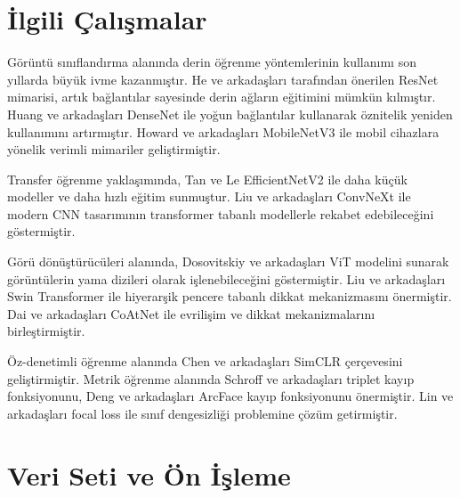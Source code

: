 \documentclass[conference]{IEEEtran}
\begin{document}
\section{\.{I}lgili \c{C}al{\i}\c{s}malar}
G\"{o}r\"{u}nt\"{u} s{\i}n{\i}fland{\i}rma alan{\i}nda derin \"{o}\u{g}renme y\"{o}ntemlerinin kullan{\i}m{\i} son y{\i}llarda b\"{u}y\"{u}k ivme kazanm{\i}\c{s}t{\i}r. He ve arkada\c{s}lar{\i} \cite{he2016deep} taraf{\i}ndan \"{o}nerilen ResNet mimarisi, art{\i}k ba\u{g}lant{\i}lar sayesinde derin a\u{g}lar{\i}n e\u{g}itimini m\"{u}mk\"{u}n k{\i}lm{\i}\c{s}t{\i}r. Huang ve arkada\c{s}lar{\i} \cite{huang2017densely} DenseNet ile yo\u{g}un ba\u{g}lant{\i}lar kullanarak \"{o}znitelik yeniden kullan{\i}m{\i}n{\i} art{\i}rm{\i}\c{s}t{\i}r. Howard ve arkada\c{s}lar{\i} \cite{howard2019searching} MobileNetV3 ile mobil cihazlara y\"{o}nelik verimli mimariler geli\c{s}tirmi\c{s}tir.

Transfer \"{o}\u{g}renme yakla\c{s}{\i}m{\i}nda, Tan ve Le \cite{tan2021efficientnetv2} EfficientNetV2 ile daha k\"{u}\c{c}\"{u}k modeller ve daha h{\i}zl{\i} e\u{g}itim sunmu\c{s}tur. Liu ve arkada\c{s}lar{\i} \cite{liu2022convnet} ConvNeXt ile modern CNN tasar{\i}m{\i}n{\i}n transformer tabanl{\i} modellerle rekabet edebilece\u{g}ini g\"{o}stermi\c{s}tir.

G\"{o}r\"{u} d\"{o}n\"{u}\c{s}t\"{u}r\"{u}c\"{u}leri alan{\i}nda, Dosovitskiy ve arkada\c{s}lar{\i} \cite{dosovitskiy2020image} ViT modelini sunarak g\"{o}r\"{u}nt\"{u}lerin yama dizileri olarak i\c{s}lenebilece\u{g}ini g\"{o}stermi\c{s}tir. Liu ve arkada\c{s}lar{\i} \cite{liu2021swin} Swin Transformer ile hiyerar\c{s}ik pencere tabanl{\i} dikkat mekanizmas{\i}n{\i} \"{o}nermi\c{s}tir. Dai ve arkada\c{s}lar{\i} \cite{dai2021coatnet} CoAtNet ile evrili\c{s}im ve dikkat mekanizmalar{\i}n{\i} birle\c{s}tirmi\c{s}tir.

\"{O}z-denetimli \"{o}\u{g}renme alan{\i}nda Chen ve arkada\c{s}lar{\i} \cite{chen2020simple} SimCLR \c{c}er\c{c}evesini geli\c{s}tirmi\c{s}tir. Metrik \"{o}\u{g}renme alan{\i}nda Schroff ve arkada\c{s}lar{\i} \cite{schroff2015facenet} triplet kay{\i}p fonksiyonunu, Deng ve arkada\c{s}lar{\i} \cite{deng2019arcface} ArcFace kay{\i}p fonksiyonunu \"{o}nermi\c{s}tir. Lin ve arkada\c{s}lar{\i} \cite{lin2017focal} focal loss ile s{\i}n{\i}f dengesizli\u{g}i problemine \c{c}\"{o}z\"{u}m getirmi\c{s}tir.

\section{Veri Seti ve \"{O}n \.{I}\c{s}leme}
\end{document}
